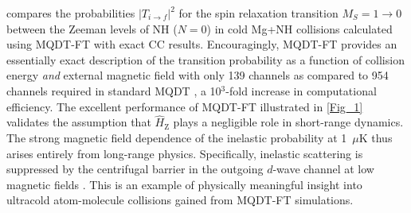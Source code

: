 \documentclass[reprint,amssymb,noeprint,twocolumn,longbibliography]{revtex4-2}
\begin{document}
 compares the probabilities $|T_{i\to f}|^2$ for the spin relaxation transition $M_S=1 \to 0$ between the Zeeman levels of NH ($N=0$) in cold Mg+NH collisions calculated using MQDT-FT with exact CC results.
Encouragingly, MQDT-FT provides an essentially exact description of the transition probability as a function of collision energy {\it and} external magnetic field with only 139 channels as compared to 954 channels required in standard MQDT \cite{Croft_12}, a 10$^3$-fold increase in computational efficiency.
The excellent performance of MQDT-FT illustrated in \cref{Fig_1} validates the assumption that $\hat{H}_\text{Z}$ plays a negligible role in short-range dynamics. 
The strong magnetic field dependence of the inelastic probability at 1~$\mu$K  thus arises entirely from long-range physics. Specifically, inelastic scattering is suppressed by the centrifugal barrier in the outgoing $d$-wave channel at low magnetic fields \cite{Volpi_02,Campbell_09}.
This is an example of physically meaningful insight into ultracold atom-molecule collisions gained from MQDT-FT simulations. 







\end{document}
